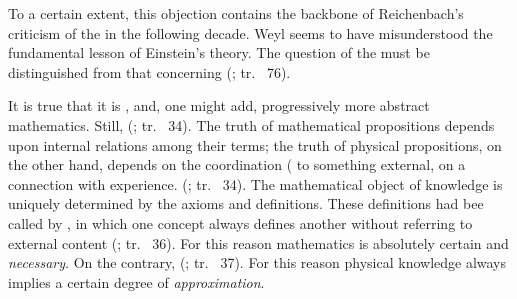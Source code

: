 \documentclass[final]{article}
\newcommand{\rhp}[2]{(\cite[#1]{Reichenbach1920a}; tr.\ \citeyear{Reichenbach1969} #2)\xspace}
\begin{document}
%
To a certain extent, this objection contains the backbone of Reichenbach's criticism of the \uftp in the following decade. Weyl seems to have misunderstood the fundamental lesson of Einstein's theory. The question of the  must be distinguished from that concerning  \rhp{73}{76}.

It is true that it is , and, one might add, progressively more abstract mathematics. Still,  \rhp{33}{34}. The truth of mathematical propositions depends upon internal relations among their terms; the truth of physical propositions, on the other hand, depends on the coordination ( to something external, on a connection with experience.  \rhp{33}{34}. The mathematical object of knowledge is uniquely determined by the axioms and definitions. These definitions had bee called by \citet{Schlick1918} , in which one concept always defines another without referring to external content \rhp{33}{36}. For this reason mathematics is absolutely certain and \emph{necessary}. On the contrary,  \rhp{34}{37}. For this reason physical knowledge always implies a certain degree of \emph{approximation}.
\end{document}
